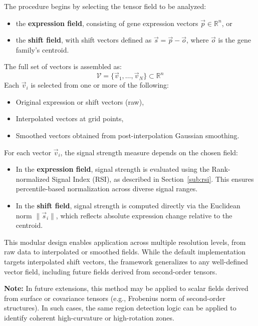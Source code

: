 \documentclass{article}
\begin{document}
The procedure begins by selecting the tensor field to be analyzed:

\begin{itemize}
    \item the \textbf{expression field}, consisting of gene expression vectors \( \vec{p} \in \mathbb{R}^n \), or
    \item the \textbf{shift field}, with shift vectors defined as \( \vec{s} = \vec{p} - \vec{o} \), where \( \vec{o} \) is the gene family's centroid.
\end{itemize}

The full set of vectors is assembled as:
\[
\mathcal{V} = \{ \vec{v}_1, \dots, \vec{v}_N \} \subset \mathbb{R}^n
\]
Each \( \vec{v}_i \) is selected from one or more of the following:

\begin{itemize}
    \item Original expression or shift vectors (raw),
    \item Interpolated vectors at grid points,
    \item Smoothed vectors obtained from post-interpolation Gaussian smoothing.
\end{itemize}

For each vector \( \vec{v}_i \), the signal strength measure depends on the chosen field:
\begin{itemize}
    \item In the \textbf{expression field}, signal strength is evaluated using the Rank-normalized Signal Index (RSI), as described in Section~\ref{sub:rsi}. This ensures percentile-based normalization across diverse signal ranges.
    \item In the \textbf{shift field}, signal strength is computed directly via the Euclidean norm \( \| \vec{s}_i \| \), which reflects absolute expression change relative to the centroid.
\end{itemize}

This modular design enables application across multiple resolution levels, from raw data to interpolated or smoothed fields. While the default implementation targets interpolated shift vectors, the framework generalizes to any well-defined vector field, including future fields derived from second-order tensors.

\textbf{Note:} In future extensions, this method may be applied to scalar fields derived from surface or covariance tensors (e.g., Frobenius norm of second-order structures). In such cases, the same region detection logic can be applied to identify coherent high-curvature or high-rotation zones.
\end{document}

